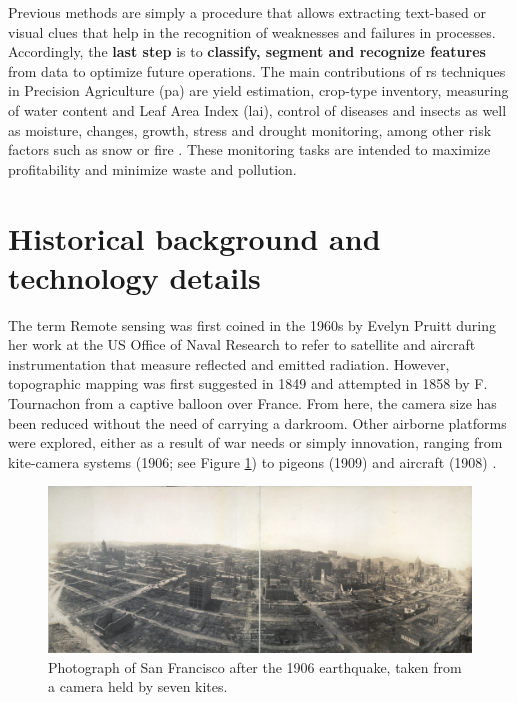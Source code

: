 Previous methods are simply a procedure that allows extracting text-based or visual clues that help in the recognition of weaknesses and failures in processes. Accordingly, the \textbf{last step} is to \textbf{classify, segment and recognize features} from data to optimize future operations. The main contributions of \acrshort{rs} techniques in Precision Agriculture (\acrshort{pa}) are yield estimation, crop-type inventory, measuring of water content and Leaf Area Index (\acrshort{lai}), control of diseases and insects as well as moisture, changes, growth, stress and drought monitoring, among other risk factors such as snow or fire \cite{huang_agricultural_2018}. These monitoring tasks are intended to maximize profitability and minimize waste and pollution. 

\section{Historical background and technology details}

The term Remote sensing was first coined in the 1960s by Evelyn Pruitt during her work at the US Office of Naval Research to refer to satellite and aircraft instrumentation that measure reflected and emitted radiation. However, topographic mapping was first suggested in 1849 and attempted in 1858 by F. Tournachon from a captive balloon over France. From here, the camera size has been reduced without the need of carrying a darkroom. Other airborne platforms were explored, either as a result of war needs or simply innovation, ranging from kite-camera systems (1906; see Figure \ref{fig:san_francisco_kite}) to pigeons (1909) and aircraft (1908) \cite{emery_introduction_2017}.

\begin{figure}[!ht]
	\includegraphics{figs/introduction/san_francisco_kitecamera.jpg}
	\caption{Photograph of San Francisco after the 1906 earthquake, taken from a camera held by seven kites. }
    \label{fig:san_francisco_kite}
\end{figure}

